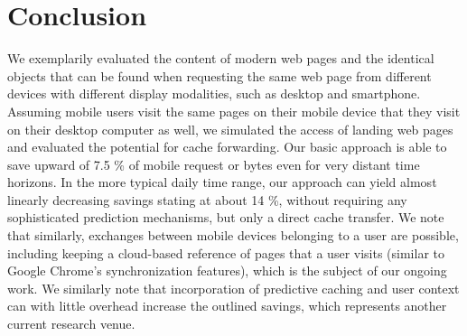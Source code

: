 \documentclass[letterpaper,journal,onecolumn,draftcls]{IEEEtran}
\begin{document}
\section{Conclusion}
\label{s:conc}
We exemplarily evaluated the content of modern web pages and the identical objects that can be found when requesting the same web page from different devices with different display modalities, such as desktop and smartphone.
Assuming mobile users visit the same pages on their mobile device that they visit on their desktop computer as well, we simulated the access of landing web pages and evaluated the potential for cache forwarding.
Our basic approach is able to save upward of 7.5 \% of mobile request or bytes even for very distant time horizons.
In the more typical daily time range, our approach can yield almost linearly decreasing savings stating at about 14 \%, without requiring any sophisticated prediction mechanisms, but only a direct cache transfer.
We note that similarly, exchanges between mobile devices belonging to a user are possible, including keeping a cloud-based reference of pages that a user visits (similar to Google Chrome's synchronization features), which is the subject of our ongoing work. We similarly note that incorporation of predictive caching and user context can with little overhead increase the outlined savings, which represents another current research venue.



\end{document}

